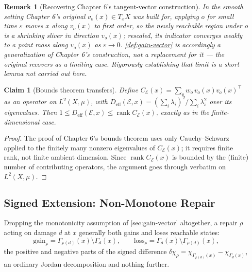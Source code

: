 \documentclass[12pt]{report}
\newtheorem{claim}[definition]{Claim}
\newtheorem{remark}[definition]{Remark}
\begin{document}
\begin{remark}[Recovering Chapter 6's tangent-vector construction]
In the smooth setting Chapter 6's original $v_o(x) \in T_xX$ was built
for, applying $o$ for small time $\varepsilon$ moves $x$ along $v_o(x)$
to first order, so the newly reachable region under $o$ is a shrinking
sliver in direction $v_o(x)$; rescaled, its indicator converges weakly
to a point mass along $v_o(x)$ as $\varepsilon \to 0$. \cref{def:gain-vector}
is accordingly a generalization of Chapter 6's construction, not a
replacement for it --- the original recovers as a limiting case.
Rigorously establishing that limit is a short lemma not carried out
here.
\end{remark}

\begin{claim}[Bounds theorem transfers]
\label{claim:bounds-transfer}
Define $C_{\mathcal{E}}(x) = \sum_o w_o\, v_o(x) v_o(x)^\top$ as an
operator on $L^2(X,\mu)$, with $D_{\mathrm{eff}}(\mathcal{E},x) =
(\sum_i \lambda_i)^2 / \sum_i \lambda_i^2$ over its eigenvalues. Then
$1 \leq D_{\mathrm{eff}}(\mathcal{E},x) \leq \operatorname{rank}
C_\mathcal{E}(x)$, exactly as in the finite-dimensional case.
\end{claim}

\begin{proof}
The proof of Chapter 6's bounds theorem uses only Cauchy--Schwarz
applied to the finitely many nonzero eigenvalues of $C_\mathcal{E}(x)$;
it requires finite rank, not finite ambient dimension. Since
$\operatorname{rank} C_\mathcal{E}(x)$ is bounded by the (finite) number
of contributing operators, the argument goes through verbatim on
$L^2(X,\mu)$.
\end{proof}

\subsection{Signed Extension: Non-Monotone Repair}
\label{sec:signed}

Dropping the monotonicity assumption of \cref{sec:gain-vector}
altogether, a repair $\rho$ acting on damage $d$ at $x$ generally both
gains and loses reachable states:
\[
\mathrm{gain}_\rho = \Gamma_{\rho(d)}(x) \setminus \Gamma_d(x), \qquad
\mathrm{loss}_\rho = \Gamma_d(x) \setminus \Gamma_{\rho(d)}(x),
\]
the positive and negative parts of the signed difference $\delta\chi_\rho
= \chi_{\Gamma_{\rho(d)}(x)} - \chi_{\Gamma_d(x)}$, an ordinary Jordan
decomposition and nothing further.
\end{document}
